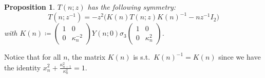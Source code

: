 \documentclass[pdftex]{sigma}%
\numberwithin{equation}{section}
\newtheorem{Proposition}[Theorem]{Proposition}
 { \theoremstyle{definition}
\newtheorem{Definition}[Theorem]{Definition}
\newtheorem{Note}[Theorem]{Note}
\newtheorem{Example}[Theorem]{Example}
\newtheorem{problem}[Theorem]{Riemann--Hilbert Problem}
\newtheorem{Remark}[Theorem]{Remark} }
\begin{document}
	\begin{Proposition} $T(n;z)$ has the following symmetry:
		\begin{equation}\label{eq:symmetry T}
			T(n;z^{-1})=-z^2\big(K(n)T(n;z)K(n)^{-1}-nz^{-1}I_2\big)
		\end{equation}
		with $K(n)\coloneqq \begin{pmatrix}
			1&0\\
			0& \kappa_{n}^{-2}
		\end{pmatrix}Y(n;0)\sigma_3\begin{pmatrix}
			1&0\\
			0& \kappa_{n}^{2}
		\end{pmatrix}$.
	\end{Proposition}

	\begin{Remark}
		Notice that for all $n$, the matrix $K(n)$ is s.t.\ $K(n)^{-1}=K(n)$ since we have the identity $x_n^2+\frac{\kappa_{n-1}^2}{\kappa_n^2}=1$.
	\end{Remark}
\end{document}
